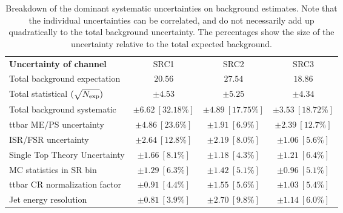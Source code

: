 
\begin{table}
\caption[Breakdown of statistical and systematic uncertainty on background estimates]{
Breakdown of the dominant systematic uncertainties on background estimates.
Note that the individual uncertainties can be correlated, and do not necessarily add up quadratically to 
the total background uncertainty. The percentages show the size of the uncertainty relative to the total expected background.
\label{table.results.bkgestimate.uncertainties.SRC1_SRC2_SRC3}}
\begin{center}
\setlength{\tabcolsep}{0.0pc}
\begin{tabular*}{\textwidth}{@{\extracolsep{\fill}}lccc}
\noalign{\smallskip}\hline\noalign{\smallskip}
{\bf Uncertainty of channel}                                    & SRC1            & SRC2            & SRC3            \\
\noalign{\smallskip}\hline\noalign{\smallskip}
Total background expectation             &  $20.56$        &  $27.54$        &  $18.86$       \\
\noalign{\smallskip}\hline\noalign{\smallskip}
Total statistical $(\sqrt{N_{\rm exp}})$              & $\pm 4.53$        & $\pm 5.25$        & $\pm 4.34$       \\
Total background systematic               & $\pm 6.62\ [32.18\%] $        & $\pm 4.89\ [17.75\%] $        & $\pm 3.53\ [18.72\%] $             \\
\noalign{\smallskip}\hline\noalign{\smallskip}
\noalign{\smallskip}\hline\noalign{\smallskip}
ttbar ME/PS uncertainty         & $\pm 4.86\ [23.6\%] $          & $\pm 1.91\ [6.9\%] $          & $\pm 2.39\ [12.7\%] $       \\
ISR/FSR uncertainty                                & $\pm 2.64\ [12.8\%] $          & $\pm 2.19\ [8.0\%] $          & $\pm 1.06\ [5.6\%] $       \\
Single Top Theory Uncertainty          & $\pm 1.66\ [8.1\%] $          & $\pm 1.18\ [4.3\%] $          & $\pm 1.21\ [6.4\%] $       \\
MC statistics in SR bin        & $\pm 1.29\ [6.3\%] $          & $\pm 1.42\ [5.1\%] $            & $\pm 0.96\ [5.1\%] $       \\
ttbar CR normalization factor         & $\pm 0.91\ [4.4\%] $          & $\pm 1.55\ [5.6\%] $          & $\pm 1.03\ [5.4\%] $       \\
Jet energy resolution         & $\pm 0.81\ [3.9\%] $          & $\pm 2.70\ [9.8\%] $          & $\pm 1.14\ [6.0\%] $       \\

\end{tabular*}
\end{center}
\end{table}
